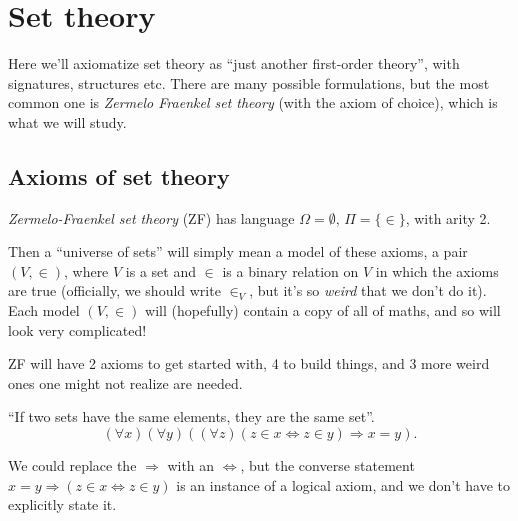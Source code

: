 \documentclass[a4paper]{article}
\begin{document}
\section{Set theory}
Here we'll axiomatize set theory as ``just another first-order theory'', with signatures, structures etc. There are many possible formulations, but the most common one is \emph{Zermelo Fraenkel set theory} (with the axiom of choice), which is what we will study.

\subsection{Axioms of set theory}
\begin{defi}
  \emph{Zermelo-Fraenkel set theory} (ZF) has language $\Omega = \emptyset$, $\Pi = \{\in\}$, with arity 2.
\end{defi}
Then a ``universe of sets'' will simply mean a model of these axioms, a pair $(V, \in)$, where $V$ is a set and $\in$ is a binary relation on $V$ in which the axioms are true (officially, we should write $\in_V$, but it's so \emph{weird} that we don't do it). Each model $(V, \in)$ will (hopefully) contain a copy of all of maths, and so will look very complicated!

ZF will have 2 axioms to get started with, 4 to build things, and 3 more weird ones one might not realize are needed.

\begin{axiom}
  ``If two sets have the same elements, they are the same set''.
  \[
    (\forall x)(\forall y)((\forall z)(z\in x\Leftrightarrow z\in y) \Rightarrow x = y).
  \]
\end{axiom}
We could replace the $\Rightarrow $ with an $\Leftrightarrow$, but the converse statement $x = y \Rightarrow (z\in x \Leftrightarrow z\in y)$ is an instance of a logical axiom, and we don't have to explicitly state it.
\end{document}
